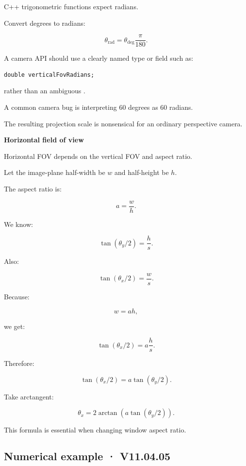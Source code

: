 \hypertarget{02-foundations-ii-ch033-units-degrees-versus-radians}{}

C++ trigonometric functions expect radians.

Convert degrees to radians:

\[
 \boxed{ \theta_{\mathrm{rad}}= \theta_{\mathrm{deg}}\frac\pi{180} }.
\]

A camera API should use a clearly named type or field such as:

\begin{verbatim}
double verticalFovRadians;
\end{verbatim}

rather than an ambiguous .

A common camera bug is interpreting 60 degrees as 60 radians.

The resulting projection scale is nonsensical for an ordinary perspective camera.

\textbf{Horizontal field of view}

Horizontal FOV depends on the vertical FOV and aspect ratio.

Let the image-plane half-width be \(w\) and half-height be \(h\).

The aspect ratio is:

\[
 a=\frac wh.
\]

We know:

\[
 \tan(\theta_y/2)=\frac hs.
\]

Also:

\[
 \tan(\theta_x/2)=\frac ws.
\]

Because:

\[
 w=ah,
\]

we get:

\[
 \tan(\theta_x/2) = a\frac hs.
\]

Therefore:

\[
 \boxed{ \tan(\theta_x/2) = a\tan(\theta_y/2) }.
\]

Take arctangent:

\[
 \boxed{ \theta_x= 2\arctan \left( a\tan(\theta_y/2) \right) }.
\]

This formula is essential when changing window aspect ratio.

\subsection{Numerical example · V11.04.05}\label{02-foundations-ii-ch033-numerical-example-v11.04.05}

\hypertarget{02-foundations-ii-ch033-numerical-example-v11.04.05}{}

